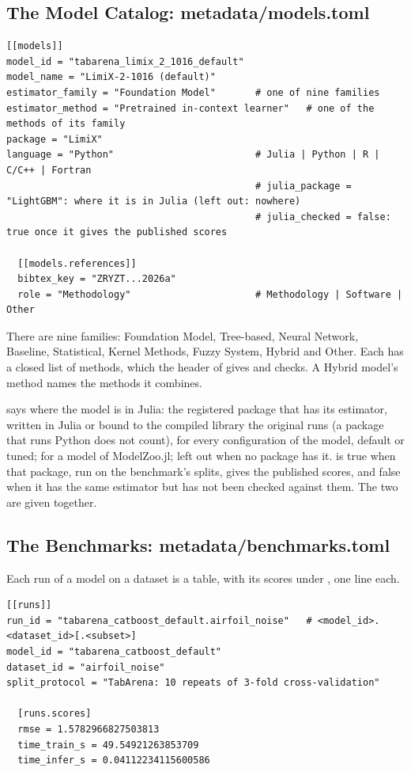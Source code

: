 \subsection{The Model Catalog: metadata/models.toml}
\label{sec:modelcatalog}

\begin{lstlisting}
[[models]]
model_id = "tabarena_limix_2_1016_default"
model_name = "LimiX-2-1016 (default)"
estimator_family = "Foundation Model"       # one of nine families
estimator_method = "Pretrained in-context learner"   # one of the methods of its family
package = "LimiX"
language = "Python"                         # Julia | Python | R | C/C++ | Fortran
                                            # julia_package = "LightGBM": where it is in Julia (left out: nowhere)
                                            # julia_checked = false: true once it gives the published scores

  [[models.references]]
  bibtex_key = "ZRYZT...2026a"
  role = "Methodology"                      # Methodology | Software | Other
\end{lstlisting}

There are nine families: Foundation Model, Tree-based, Neural Network, Baseline, Statistical, Kernel Methods, Fuzzy
System, Hybrid and Other. Each has a closed list of methods, which the header of  gives and
 checks. A Hybrid model's method names the methods it combines.

 says where the model is in Julia: the registered package that has its estimator, written in Julia
or bound to the compiled library the original runs (a package that runs Python does not count), for every
configuration of the model, default or tuned;  for a model of ModelZoo.jl; left out when no package
has it.  is true when that package, run on the benchmark's splits, gives the published scores,
and false when it has the same estimator but has not been checked against them. The two are given together.

\subsection{The Benchmarks: metadata/benchmarks.toml}

Each run of a model on a dataset is a \file{[[runs]]} table, with its scores under , one
 line each.

\begin{lstlisting}
[[runs]]
run_id = "tabarena_catboost_default.airfoil_noise"   # <model_id>.<dataset_id>[.<subset>]
model_id = "tabarena_catboost_default"
dataset_id = "airfoil_noise"
split_protocol = "TabArena: 10 repeats of 3-fold cross-validation"

  [runs.scores]
  rmse = 1.5782966827503813
  time_train_s = 49.54921263853709
  time_infer_s = 0.04112234115600586
\end{lstlisting}


